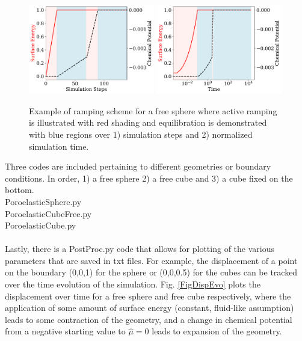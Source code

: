 \documentclass[12pt,3p]{article}
\numberwithin{equation}{section}
\begin{document}
\begin{figure}[!htb]
\centering
\includegraphics[width=0.49\textwidth]{../Images/SphereSimSteps}
\includegraphics[width=0.49\textwidth]{../Images/SphereSimTime}
\caption{Example of ramping scheme for a free sphere where active ramping is illustrated with red shading and equilibration is demonstrated with blue regions over 1) simulation steps and 2) normalized simulation time. }
\label{FigRampingRegime}
\end{figure}

Three codes are included pertaining to different geometries or boundary conditions. In order, 1) a free sphere 2) a free cube and 3) a cube fixed on the bottom. \\
{\selectfont 
PoroelasticSphere.py \\
PoroelasticCubeFree.py \\
PoroelasticCube.py \\ \\ 
}
Lastly, there is a {\selectfont PostProc.py} code that allows for plotting of the various parameters that are saved in txt files. For example, the displacement of a point on the boundary (0,0,1) for the sphere or (0,0,0.5) for the cubes can be tracked over the time evolution of the simulation. Fig. \ref{FigDispEvo} plots the displacement over time for a free sphere and free cube respectively, where the application of some amount of surface energy (constant, fluid-like assumption) leads to some contraction of the geometry, and a change in chemical potential from a negative starting value to $\hat{\mu} = 0$ leads to expansion of the geometry. 
\end{document}
